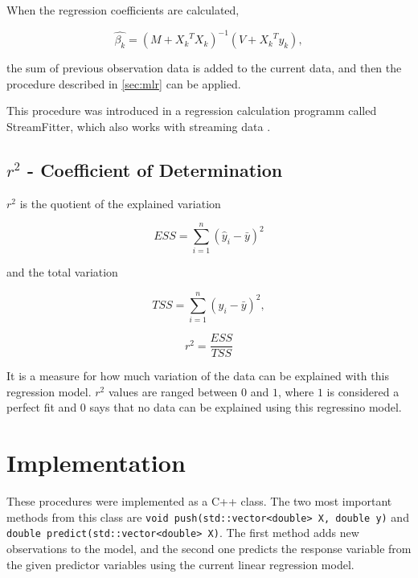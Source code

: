 When the regression coefficients are calculated,

\begin{equation}
    \hat{\beta_k} = (M + {X_k}^T X_k)^{-1}(V + {X_k}^T y_k),
\end{equation}

the sum of previous observation data is added to the current data, and then the procedure described in \vref{sec:mlr} can be applied.

This procedure was introduced in a regression calculation programm called StreamFitter, which also works with streaming data \autocite{StreamFitter}.

\subsection{$ r^2 $ - Coefficient of Determination}
\label{sec:rsquared}

$ r^2 $ is the quotient of the explained variation

\begin{equation}
    ESS = \sum_{i=1}^{n} (\hat{y}_i - \bar{y})^2
\end{equation}

and the total variation

\begin{equation}
    TSS = \sum_{i=1}^{n} (y_i - \bar{y})^2,
\end{equation}

\begin{equation}
    r^2 = \frac{ESS}{TSS}
\end{equation}

It is a measure for how much variation of the data can be explained with this regression model. $ r^2 $ values are ranged between $ 0 $ and $ 1 $, where $ 1 $ is considered a perfect fit and $ 0 $ says that no data can be explained using this regressino model.

\section{Implementation}

These procedures were implemented as a C++ class. The two most important methods from this class are \lstinline{void push(std::vector<double> X, double y)} and \lstinline{double predict(std::vector<double> X)}. The first method adds new observations to the model, and the second one predicts the response variable from the given predictor variables using the current linear regression model.

